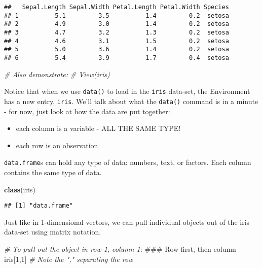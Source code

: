 \documentclass[]{article}
\newenvironment{Shaded}{\begin{snugshade}}{\end{snugshade}}
\newcommand{\KeywordTok}[1]{\textcolor[rgb]{0.13,0.29,0.53}{\textbf{#1}}}
\newcommand{\DecValTok}[1]{\textcolor[rgb]{0.00,0.00,0.81}{#1}}
\newcommand{\CommentTok}[1]{\textcolor[rgb]{0.56,0.35,0.01}{\textit{#1}}}
\newcommand{\NormalTok}[1]{#1}
\providecommand{\tightlist}{%
  \setlength{\itemsep}{0pt}\setlength{\parskip}{0pt}}
\begin{document}
\begin{verbatim}
##   Sepal.Length Sepal.Width Petal.Length Petal.Width Species
## 1          5.1         3.5          1.4         0.2  setosa
## 2          4.9         3.0          1.4         0.2  setosa
## 3          4.7         3.2          1.3         0.2  setosa
## 4          4.6         3.1          1.5         0.2  setosa
## 5          5.0         3.6          1.4         0.2  setosa
## 6          5.4         3.9          1.7         0.4  setosa
\end{verbatim}

\begin{Shaded}
\begin{Highlighting}[]
\CommentTok{# Also demonstrate:}
\CommentTok{# View(iris)}
\end{Highlighting}
\end{Shaded}

Notice that when we use \texttt{data()} to load in the \texttt{iris}
data-set, the Environment has a new entry, \texttt{iris}. We'll talk
about what the \texttt{data()} command is in a minute - for now, just
look at how the data are put together:

\begin{itemize}
\tightlist
\item
  each column is a variable - ALL THE SAME TYPE!
\item
  each row is an observation
\end{itemize}

\texttt{data.frame}s can hold any type of data: numbers, text, or
factors. Each column contains the same type of data.

\begin{Shaded}
\begin{Highlighting}[]
\KeywordTok{class}\NormalTok{(iris)}
\end{Highlighting}
\end{Shaded}

\begin{verbatim}
## [1] "data.frame"
\end{verbatim}

Just like in 1-dimensional vectors, we can pull individual objects out
of the iris data-set using matrix notation.

\begin{Shaded}
\begin{Highlighting}[]
\CommentTok{# To pull out the object in row 1, column 1:}
\NormalTok{### Row first, then column}
\NormalTok{iris[}\DecValTok{1}\NormalTok{,}\DecValTok{1}\NormalTok{] }\CommentTok{# Note the "," separating the row}
\end{Highlighting}
\end{Shaded}
\end{document}
